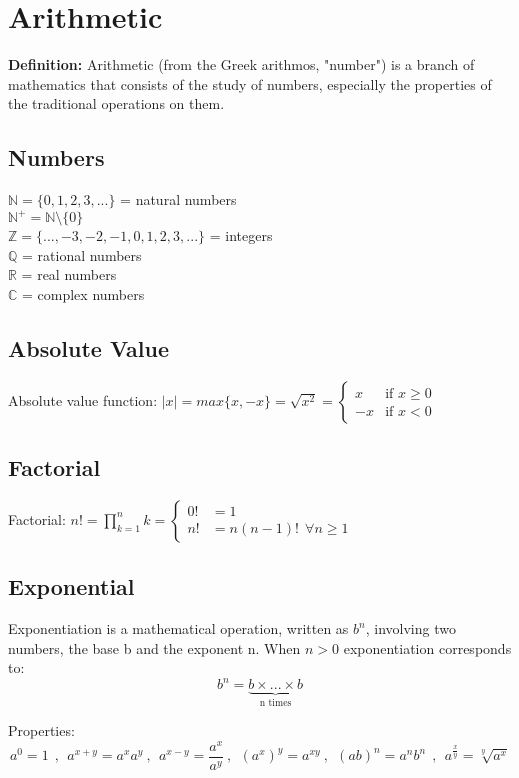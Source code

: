 \chapter{Arithmetic}
\textbf{Definition:} Arithmetic (from the Greek arithmos, "number") is a branch of mathematics that consists of the study of numbers, especially the properties of the traditional operations on them.

\section{Numbers}

$\mathbb{N} = \{0,1,2,3,...\} $ = natural numbers \\
$\mathbb{N^+} = \mathbb{N}\setminus\{0\}$ \\
$\mathbb{Z} = \{...,-3,-2,-1,0,1,2,3,...\} $ = integers \\
$\mathbb{Q}$ = rational numbers \\
$\mathbb{R}$ = real numbers \\
$\mathbb{C}$ = complex numbers

\section{Absolute Value}

Absolute value function: $ \left|x\right| = max\{x,-x\} = \sqrt{x^2} = \begin{cases}
x & \text{if } x\geq0\\
-x & \text{if } x<0
\end{cases} $

\section{Factorial}

Factorial: $ n! = \prod_{k=1}^{n}k  = \begin{cases}
0! &= 1\\
n! &= n(n-1)! \ \ \forall n\ge1
\end{cases} $

\section{Exponential}
Exponentiation is a mathematical operation, written as $b^n$, involving two numbers, the base b and the exponent n. When $n>0$ exponentiation corresponds to: $$b^n=\underbrace{b \times ... \times b}_\text{n times}$$

Properties:
\[
a^0=1 \ \ , \ \ a^{x+y}=a^xa^y \ , \ \ a^{x-y}=\frac{a^x}{a^y} \ , \ \ (a^x)^y=a^{xy} \ , \ \ (ab)^n = a^nb^n \ \ , \ \ a^{\frac{x}{y}}=\sqrt[y]{a^x}
\]

